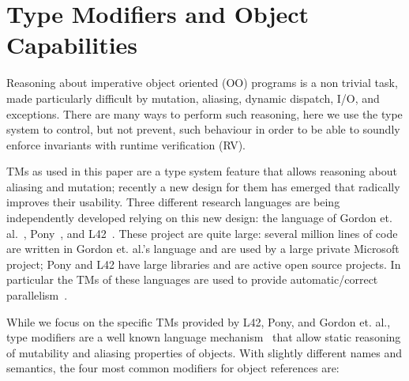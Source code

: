 \section{Type Modifiers and Object Capabilities}
\label{s:TMsAndOCs}
Reasoning about imperative object oriented (OO) programs is a non trivial task,
made particularly difficult by mutation, aliasing, dynamic dispatch, I/O, and exceptions. There are many ways to perform such reasoning, here we use the type system to control, but not prevent, such behaviour in order to be able to soundly enforce invariants with runtime verification (RV).

 TMs as used in this paper are a type system feature that allows reasoning about aliasing and mutation; recently a new design for them has emerged that radically improves their usability.
Three different research languages are being independently developed relying on this new design: the language of Gordon et. al.~\cite{GordonEtAl12}, Pony~\cite{clebsch2015deny,clebsch2017orca}, and L42~\cite{ServettoZucca15,ServettoEtAl13a,JOT:issue_2011_01/article1,GianniniEtAl16}.
These project are quite large: several million lines of code are written in Gordon et. al.'s language and are used by a large private Microsoft project; Pony and L42 have large libraries and are active open source projects. In particular the TMs of these languages are used to provide automatic/correct parallelism~\cite{GordonEtAl12,clebsch2015deny,clebsch2017orca,ServettoEtAl13a}.

While we focus on the specific TMs provided by L42, Pony, and Gordon et. al., type modifiers
 are a well known language mechanism~\cite{TschantzErnst05,BirkaErnst04,OstlundEtAl08,clebsch2015deny,GianniniEtAl16,GordonEtAl12}
 that allow static reasoning of mutability and aliasing properties of objects.
With slightly different names and semantics, the four most common modifiers for object references are:

